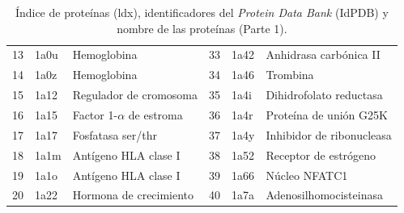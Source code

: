 \begin{table}[H]
\begin{footnotesize}
\begin{tabular}{||l|ll||l|ll||}
 				13  & 1a0u  & Hemoglobina                  & 33 & 1a42  & Anhidrasa carb\'{o}nica II        \\
 				14  & 1a0z  & Hemoglobina                  & 34 & 1a46  & Trombina                      \\
 				15  & 1a12  & Regulador de cromosoma       & 35 & 1a4i  & Dihidrofolato reductasa       \\
 				16  & 1a15  & Factor 1-$\alpha$ de estroma & 36 & 1a4r  & Prote\'{i}na de uni\'{o}n G25K        \\
 				17  & 1a17  & Fosfatasa ser/thr            & 37 & 1a4y  & Inhibidor de ribonucleasa     \\
 				18  & 1a1m  & Ant\'{i}geno  HLA clase I        & 38 & 1a52  & Receptor de estr\'{o}geno         \\
 				19  & 1a1o  & Ant\'{i}geno  HLA clase I        & 39 & 1a66  & N\'{u}cleo NFATC1                 \\
 				20  & 1a22  & Hormona de crecimiento       & 40 & 1a7a  & Adenosilhomocisteinasa        \\ \hline
 			\end{tabular}
 		\end{footnotesize}
 		\caption{\'{I}ndice de prote\'{i}nas (ldx), identificadores del \emph{Protein Data Bank} (IdPDB) y nombre de las prote\'{i}nas (Parte 1).}
 		\label{Tabla:ids79(1)}
 	\end{table}
 	

